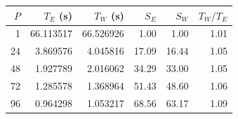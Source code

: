 \begin{center}
\small
\begin{tabular}{rrrrrr}
\toprule
$P$ & $T_E$ (s) & $T_W$ (s) & $S_E$ & $S_W$ & $T_W/T_E$ \\
\midrule
1 & 66.113517 & 66.526926 & 1.00 & 1.00 & 1.01 \\
24 & 3.869576 & 4.045816 & 17.09 & 16.44 & 1.05 \\
48 & 1.927789 & 2.016062 & 34.29 & 33.00 & 1.05 \\
72 & 1.285578 & 1.368964 & 51.43 & 48.60 & 1.06 \\
96 & 0.964298 & 1.053217 & 68.56 & 63.17 & 1.09 \\
\bottomrule
\end{tabular}
\end{center}

